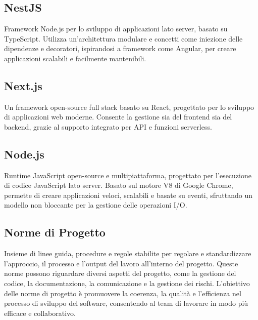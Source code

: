 \newpage



\section{}

\hypertarget{sec:nestjs}{}
\subsection*{NestJS}
Framework Node.js per lo sviluppo di applicazioni lato server, basato su TypeScript. Utilizza un'architettura modulare e concetti come iniezione delle 
dipendenze e decoratori, ispirandosi a framework come Angular, per creare applicazioni scalabili e facilmente mantenibili.

\hypertarget{sec:nextjs}{}
\subsection*{Next.js}
Un framework open-source full stack basato su React, progettato per lo sviluppo di applicazioni web moderne. Consente la gestione sia del frontend sia 
del backend, grazie al supporto integrato per API e funzioni serverless.

\hypertarget{sec:nodejs}{}
\subsection*{Node.js}
Runtime JavaScript open-source e multipiattaforma, progettato per l'esecuzione di codice JavaScript lato server. Basato sul motore V8 di Google Chrome, 
permette di creare applicazioni veloci, scalabili e basate su eventi, sfruttando un modello non bloccante per la gestione delle operazioni I/O.

\subsection*{Norme di Progetto}
Insieme di linee guida, procedure e regole stabilite per regolare e standardizzare l’approccio, il processo e l’output del lavoro all’interno del progetto. 
Queste norme possono riguardare diversi aspetti del progetto, come la gestione del codice, la documentazione, la comunicazione e la gestione dei rischi. 
L’obiettivo delle norme di progetto è promuovere la coerenza, la qualità e l’efficienza nel processo di sviluppo del software, consentendo al team di 
lavorare in modo più efficace e collaborativo.

